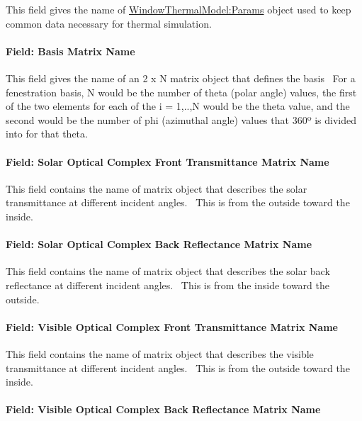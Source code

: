 This field gives the name of \hyperref[windowthermalmodelparams]{WindowThermalModel:Params} object used to keep common data necessary for thermal simulation.

\paragraph{Field: Basis Matrix Name}\label{field-basis-matrix-name}

This field gives the name of an 2 x N matrix object that defines the basis~ For a fenestration basis, N would be the number of theta (polar angle) values, the first of the two elements for each of the i = 1,..,N would be the theta value, and the second would be the number of phi (azimuthal angle) values that 360º is divided into for that theta.

\paragraph{Field: Solar Optical Complex Front Transmittance Matrix Name}\label{field-solar-optical-complex-front-transmittance-matrix-name}

This field contains the name of matrix object that describes the solar transmittance at different incident angles.~ This is from the outside toward the inside.

\paragraph{Field: Solar Optical Complex Back Reflectance Matrix Name}\label{field-solar-optical-complex-back-reflectance-matrix-name}

This field contains the name of matrix object that describes the solar back reflectance at different incident angles.~ This is from the inside toward the outside.

\paragraph{Field: Visible Optical Complex Front Transmittance Matrix Name}\label{field-visible-optical-complex-front-transmittance-matrix-name}

This field contains the name of matrix object that describes the visible transmittance at different incident angles.~ This is from the outside toward the inside.

\paragraph{Field: Visible Optical Complex Back Reflectance Matrix Name}\label{field-visible-optical-complex-back-reflectance-matrix-name}

